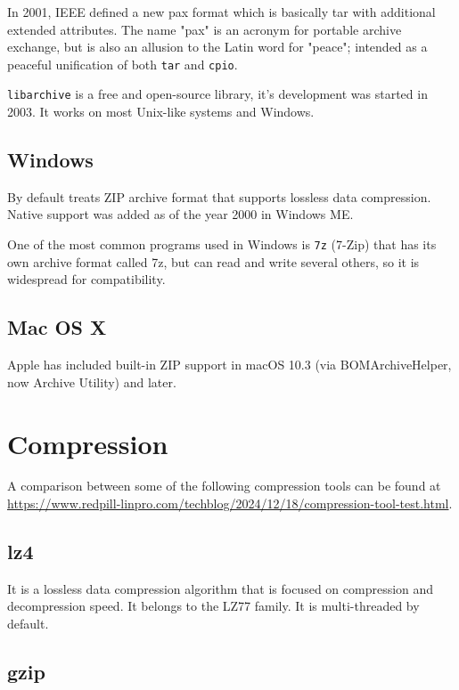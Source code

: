 \documentclass[12pt, a4paper]{report}
\begin{document}
In 2001, IEEE defined a new pax format which is basically tar with additional extended attributes.
The name "pax" is an acronym for portable archive exchange, but is also an allusion to the Latin word for "peace"; intended as a
peaceful unification of both \texttt{tar} and \texttt{cpio}.

\texttt{libarchive} is a free and open-source library, it's development was started in 2003.
It works on most Unix-like systems and Windows.

\subsection{Windows}

By default treats ZIP archive format that supports lossless data compression.
Native support was added as of the year 2000 in Windows ME.

One of the most common programs used in Windows is \texttt{7z} (7-Zip) that has its own archive format called 7z, but can read and
write several others, so it is widespread for compatibility.

\subsection{Mac OS X}

Apple has included built-in ZIP support in macOS 10.3 (via BOMArchiveHelper, now Archive Utility) and later.

\section{Compression}

A comparison between some of the following compression tools can be found at
\href{https://www.redpill-linpro.com/techblog/2024/12/18/compression-tool-test.html}
{https://www.redpill-linpro.com/techblog/2024/12/18/compression-tool-test.html}.

\subsection{lz4}

It is a lossless data compression algorithm that is focused on compression and decompression speed.
It belongs to the LZ77 family.
It is multi-threaded by default.

\subsection{gzip}
\end{document}

